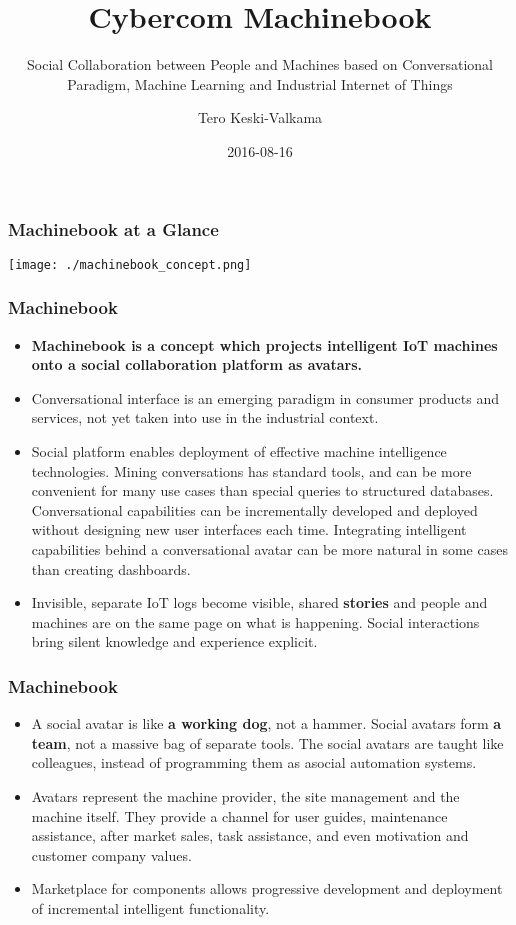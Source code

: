 \documentclass[8pt]{beamer}
\title{Cybercom Machinebook}
\subtitle{Social Collaboration between People and Machines based on Conversational Paradigm, Machine Learning and Industrial Internet of Things}
\author{Tero Keski-Valkama}
\institute{\texttt{[image: CybercomG\_logo\_Classic\_RGB.png]}}
\date{2016-08-16}
\begin{document}
\frame{\titlepage}

\begin{frame}
\frametitle{Machinebook at a Glance}
\texttt{[image: ./machinebook\_concept.png]}
\end{frame}

\begin{frame}
\frametitle{Machinebook}
\begin{itemize}
 \item \textbf{Machinebook is a concept which projects intelligent IoT machines onto a social collaboration platform as avatars.}
 \item Conversational interface is an emerging paradigm in consumer products and services, not yet taken into use in the industrial context.
 \item Social platform enables deployment of effective machine intelligence technologies. Mining conversations has standard tools, and can be more convenient for
       many use cases than special queries to structured databases. Conversational capabilities can be incrementally developed and deployed without designing
       new user interfaces each time. Integrating intelligent capabilities behind a conversational avatar can be more natural in some cases than creating dashboards.
 \item Invisible, separate IoT logs become visible, shared \textbf{stories} and people and machines are on the same page on what is happening.
       Social interactions bring silent knowledge and experience explicit.
\end{itemize}
\end{frame}
      
\begin{frame}
\frametitle{Machinebook}
\begin{itemize}
 \item A social avatar is like \textbf{a working dog}, not a hammer. Social avatars form \textbf{a team}, not a massive bag of separate tools.
       The social avatars are taught like colleagues, instead of programming them as asocial automation systems.
 \item Avatars represent the machine provider, the site management and the machine itself. They provide a channel for user guides, maintenance assistance, after market sales,
       task assistance, and even motivation and customer company values.
 \item Marketplace for components allows progressive development and deployment of incremental intelligent functionality.
\end{itemize}

\end{frame}
\end{document}
